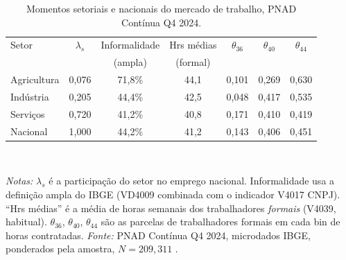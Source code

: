 \documentclass[10pt,twocolumn]{article}
\begin{document}
\begin{table}[t]
\centering
\caption{Momentos setoriais e nacionais do mercado de trabalho, PNAD Cont\'inua Q4 2024.}\label{tab:facts_informality}
\small
\begin{tabular}{lcccccc}
\hline\hline
Setor & $\lambda_s$ & Informalidade & Hrs m\'edias & $\theta_{36}$ & $\theta_{40}$ & $\theta_{44}$ \\
 & & (ampla) & (formal) & & & \\
\hline
Agricultura & 0{,}076 & 71{,}8\% & 44{,}1 & 0{,}101 & 0{,}269 & 0{,}630 \\
Ind\'ustria & 0{,}205 & 44{,}4\% & 42{,}5 & 0{,}048 & 0{,}417 & 0{,}535 \\
Servi\c{c}os & 0{,}720 & 41{,}2\% & 40{,}8 & 0{,}171 & 0{,}410 & 0{,}419 \\
\hline
Nacional    & 1{,}000 & 44{,}2\% & 41{,}2 & 0{,}143 & 0{,}406 & 0{,}451 \\
\hline\hline
\end{tabular}
\\[2pt]
\begin{minipage}{0.95\textwidth}
\justifying
{\footnotesize \textit{Notas:} $\lambda_s$ \'e a participa\c{c}\~ao do setor no emprego nacional. Informalidade usa a defini\c{c}\~ao ampla do IBGE (VD4009 combinada com o indicador V4017 CNPJ). ``Hrs m\'edias'' \'e a m\'edia de horas semanais dos trabalhadores \emph{formais} (V4039, habitual). $\theta_{36}$, $\theta_{40}$, $\theta_{44}$ s\~ao as parcelas de trabalhadores formais em cada bin de horas contratadas. \textit{Fonte:} PNAD Cont\'inua Q4 2024, microdados IBGE, ponderados pela amostra, $N=209{,}311$ \citep{PNAD2025}.}
\end{minipage}
\end{table}
\end{document}
